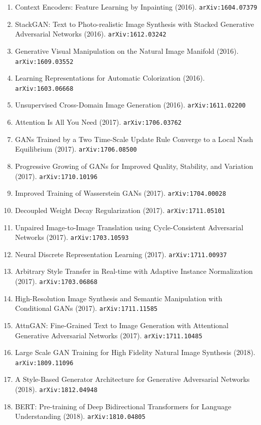 \documentclass[11pt]{article}
\begin{document}
\begin{enumerate}
  \item Context Encoders: Feature Learning by Inpainting (2016). \texttt{arXiv:1604.07379}
  \item StackGAN: Text to Photo-realistic Image Synthesis with Stacked Generative Adversarial Networks (2016). \texttt{arXiv:1612.03242}
  \item Generative Visual Manipulation on the Natural Image Manifold (2016). \texttt{arXiv:1609.03552}
  \item Learning Representations for Automatic Colorization (2016). \texttt{arXiv:1603.06668}
  \item Unsupervised Cross-Domain Image Generation (2016). \texttt{arXiv:1611.02200}
  \item Attention Is All You Need (2017). \texttt{arXiv:1706.03762}
  \item GANs Trained by a Two Time-Scale Update Rule Converge to a Local Nash Equilibrium (2017). \texttt{arXiv:1706.08500}
  \item Progressive Growing of GANs for Improved Quality, Stability, and Variation (2017). \texttt{arXiv:1710.10196}
  \item Improved Training of Wasserstein GANs (2017). \texttt{arXiv:1704.00028}
  \item Decoupled Weight Decay Regularization (2017). \texttt{arXiv:1711.05101}
  \item Unpaired Image-to-Image Translation using Cycle-Consistent Adversarial Networks (2017). \texttt{arXiv:1703.10593}
  \item Neural Discrete Representation Learning (2017). \texttt{arXiv:1711.00937}
  \item Arbitrary Style Transfer in Real-time with Adaptive Instance Normalization (2017). \texttt{arXiv:1703.06868}
  \item High-Resolution Image Synthesis and Semantic Manipulation with Conditional GANs (2017). \texttt{arXiv:1711.11585}
  \item AttnGAN: Fine-Grained Text to Image Generation with Attentional Generative Adversarial Networks (2017). \texttt{arXiv:1711.10485}
  \item Large Scale GAN Training for High Fidelity Natural Image Synthesis (2018). \texttt{arXiv:1809.11096}
  \item A Style-Based Generator Architecture for Generative Adversarial Networks (2018). \texttt{arXiv:1812.04948}
  \item BERT: Pre-training of Deep Bidirectional Transformers for Language Understanding (2018). \texttt{arXiv:1810.04805}

\end{enumerate}
\end{document}
